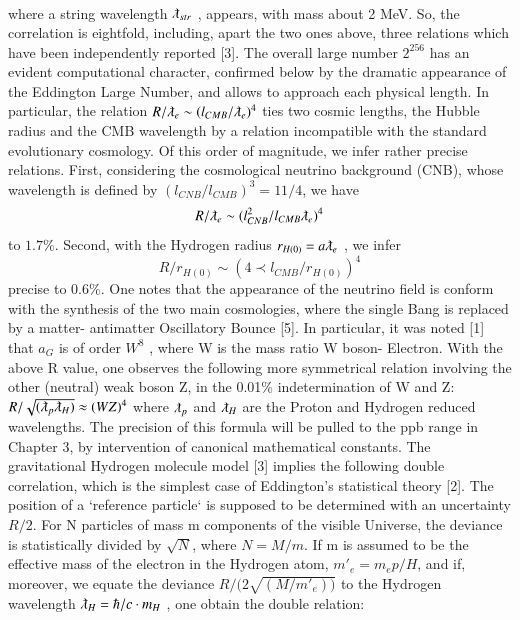 \documentclass[twoside,draft]{article}
\begin{document}
{$$\begin{array}{ll}
\end{array}
$$
where a string wavelength $\lambdabar_{str}$ , appears, with mass about 2 MeV. So, the correlation is eightfold,
including, apart the two ones above, three relations which have been independently reported [3].
The overall large number $2^{256}$ has an evident computational character, confirmed below by the
dramatic appearance of the Eddington Large Number, and allows to approach each physical length.
In particular, the relation $R/\lambdabar_{e} \sim (l_{CMB} / \lambdabar_{e})^{4}$ ties two cosmic lengths, the Hubble radius and the CMB wavelength by a relation incompatible with the standard evolutionary cosmology. Of this order of
magnitude, we infer rather precise relations. First, considering the cosmological neutrino
background (CNB), whose wavelength is defined by $(l_{CNB} / l_{CMB})^{3} = 11/4$, we have $$R/ \lambdabar_{e} \sim
( l_{CNB}^{2} / l_{CMB} \lambdabar_{e} )^{4}$$ to $1.7\%$. Second, with the Hydrogen radius $r_{H(0)} = a\lambdabar_{e}$ , we infer 
\begin{equation}
R/r_{H(0)} \sim (4 \prec l_{CMB} /r_{H(0)} )^{4}
\end{equation}
precise to $0.6\%$. One notes that the appearance of the neutrino field is conform
with the synthesis of the two main cosmologies, where the single Bang is replaced by a matter-
antimatter Oscillatory Bounce [5].
In particular, it was noted [1] that $a_{G}$ is of order $W^{8}$ , where W is the mass ratio W boson-
Electron. With the above R value, one observes the following more symmetrical relation involving
the other (neutral) weak boson Z, in the 0.01\% indetermination of W and Z:
$R/\sqrt{(\lambdabar_{p} \lambdabar_{H})} \approx (WZ)^4$
where $\lambdabar_{p}$ and $\lambdabar_{H}$ are the Proton and Hydrogen reduced wavelengths. The precision of this formula
will be pulled to the ppb range in Chapter 3, by intervention of canonical mathematical constants.
The gravitational Hydrogen molecule model [3] implies the following double correlation,
which is the simplest case of Eddington's statistical theory [2]. The position of a `reference particle`
is supposed to be determined with an uncertainty ${R/2}$. For N particles of mass m components of the visible Universe, the deviance is statistically divided by $\sqrt{N}$, where $N = M/m$. If m is assumed to be
the effective mass of the electron in the Hydrogen atom, $m\prime_{e} = m_{e} p/H$, and if, moreover, we equate
the deviance $R/(2\sqrt{(M/m\prime_{e}))}$ to the Hydrogen wavelength $\lambdabar_{H} = \hbar/c \cdot m_{H}$ , one obtain the double relation:
}
\end{document}
